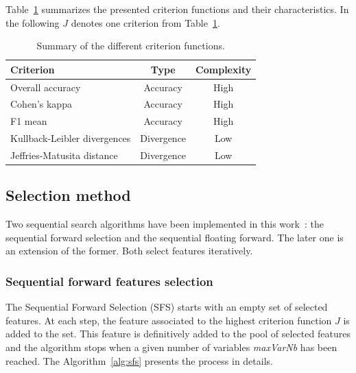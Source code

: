 \documentclass[journal,10pt]{IEEEtran}
\begin{document}
        Table~\ref{tab:crit} summarizes the presented criterion functions and their characteristics. In the following $J$ denotes one criterion from Table~\ref{tab:crit}.

        \begin{table}[!t]
            \centering
            \caption{Summary of the different criterion functions.\label{tab:crit}}
            \begin{tabular}[b]{lcc}
              \toprule
              Criterion & Type & Complexity \\
              \midrule
              Overall accuracy            & Accuracy   & High \\
              Cohen's kappa               & Accuracy   & High\\
              F1 mean                     & Accuracy   & High\\
              \midrule
              Kullback-Leibler divergences & Divergence & Low \\
              Jeffries-Matusita distance  & Divergence & Low \\
              \bottomrule
            \end{tabular}
        \end{table}

        \subsection{Selection method}
        \label{sec:selection:method}
        Two  sequential  search  algorithms have been  implemented  in  this
        work~\cite{Guyon:2006:FEF:1208773}:  the   sequential  forward
        selection and the sequential  floating forward.  The later one
        is  an   extension  of   the  former.  Both   select  features
        iteratively.

        \subsubsection{Sequential forward features selection}
        \label{sec:forward-presentation}

        The Sequential Forward Selection (SFS) starts with an empty set of selected features.  At each  step, the feature associated to the highest criterion function $J$  is added  to the set. This feature is definitively added to the pool of selected features and the algorithm stops when a given number of variables \emph{maxVarNb} has been reached. The Algorithm~\ref{alg:sfs} presents the process in details.
\end{document}
